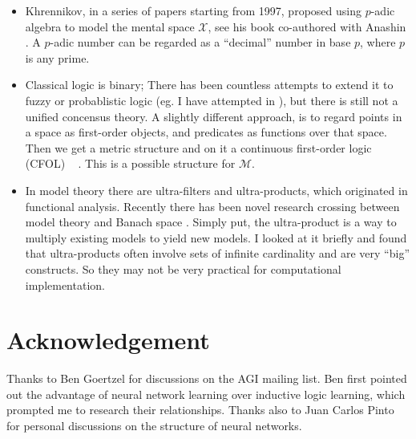 \documentclass[orivec]{llncs}
\begin{document}
\begin{itemize}
\item Khrennikov, in a series of papers starting from 1997, proposed using $p$-adic algebra to model the mental space $\mathcal{X}$, see his book co-authored with Anashin \cite{Anashin2009}.  A $p$-adic number can be regarded as a ``decimal'' number in base $p$, where $p$ is any prime.

\item Classical logic is binary;  There has been countless attempts to extend it to fuzzy or probablistic logic (eg. I have attempted in \cite{Yan2012}), but there is still not a unified concensus theory.  A slightly different approach, is to regard points in a space as first-order objects, and predicates as functions over that space.  Then we get a metric structure and on it a continuous first-order logic (CFOL) ~ \cite{Yaacov2008}.  This is a possible structure for $\mathcal{M}$.

\item In model theory there  are ultra-filters and ultra-products, which originated in functional analysis.  Recently there has been novel research crossing between model theory and Banach space \cite{Iovino2002}.  Simply put, the ultra-product is a way to multiply existing models to yield new models.  I looked at it briefly and found that ultra-products often involve sets of infinite cardinality and are very ``big'' constructs.  So they may not be very practical for computational implementation.

\end{itemize}

\section*{Acknowledgement}

\footnotesize{Thanks to Ben Goertzel for discussions on the AGI mailing list.  Ben first pointed out the advantage of neural network learning over inductive logic learning, which prompted me to research their relationships.  Thanks also to Juan Carlos Pinto for personal discussions on the structure of neural networks.}
\end{document}
